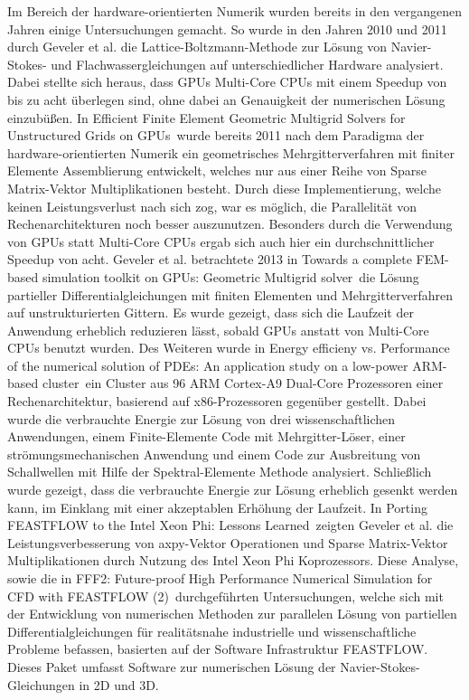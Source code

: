 Im Bereich der hardware-orientierten Numerik wurden bereits in den vergangenen Jahren einige Untersuchungen gemacht. So wurde in den Jahren 2010 und 2011 durch Geveler et al. die Lattice-Boltzmann-Methode zur Lösung von Navier-Stokes- und Flachwassergleichungen auf unterschiedlicher Hardware analysiert. Dabei stellte sich heraus, dass GPUs Multi-Core CPUs mit einem Speedup von bis zu acht überlegen sind, ohne dabei an Genauigkeit der numerischen Lösung einzubü\ss en. 
In \glqq Efficient Finite Element Geometric Multigrid Solvers for Unstructured Grids on GPUs\grqq\, wurde bereits 2011 nach dem Paradigma der hardware-orientierten Numerik ein geometrisches Mehrgitterverfahren mit finiter Elemente Assemblierung entwickelt, welches nur aus einer Reihe von Sparse Matrix-Vektor Multiplikationen besteht. Durch diese Implementierung, welche keinen Leistungsverlust nach sich zog, war es möglich, die Parallelität von Rechenarchitekturen noch besser auszunutzen. Besonders durch die Verwendung von GPUs statt Multi-Core CPUs ergab sich auch hier ein durchschnittlicher Speedup von acht.
Geveler et al. betrachtete 2013 in \glqq 
Towards a complete FEM-based simulation toolkit on GPUs: Geometric Multigrid solver\grqq\, die Lösung partieller Differentialgleichungen mit finiten Elementen und Mehrgitterverfahren auf unstrukturierten Gittern. Es wurde gezeigt, dass sich die Laufzeit der Anwendung erheblich reduzieren lässt, sobald GPUs anstatt von Multi-Core CPUs benutzt wurden. 
Des Weiteren wurde in \glqq Energy efficieny vs. Performance of the numerical solution of PDEs: An application study on a low-power ARM-based cluster\grqq\, ein Cluster aus 96 ARM Cortex-A9 Dual-Core Prozessoren einer Rechenarchitektur, basierend auf x86-Prozessoren gegenüber gestellt. Dabei wurde die verbrauchte Energie zur Lösung von drei wissenschaftlichen Anwendungen, einem Finite-Elemente Code mit Mehrgitter-Löser, einer strömungsmechanischen Anwendung und einem Code zur Ausbreitung von Schallwellen mit Hilfe der Spektral-Elemente Methode analysiert. Schließlich wurde gezeigt, dass die verbrauchte Energie zur Lösung erheblich gesenkt werden kann, im Einklang mit einer akzeptablen Erhöhung der Laufzeit. 
In \glqq Porting FEASTFLOW to the Intel Xeon Phi: Lessons Learned\grqq\, zeigten Geveler et al. die Leistungsverbesserung von axpy-Vektor Operationen und Sparse Matrix-Vektor Multiplikationen durch Nutzung des Intel Xeon Phi Koprozessors. Diese Analyse, sowie die in \glqq FFF2: Future-proof High Performance Numerical Simulation for CFD with FEASTFLOW (2)\grqq\, durchgeführten Untersuchungen, welche sich mit der Entwicklung von numerischen Methoden zur parallelen Lösung von partiellen Differentialgleichungen für realitätsnahe industrielle und wissenschaftliche Probleme befassen, basierten auf der Software Infrastruktur \glqq FEASTFLOW\grqq. Dieses Paket umfasst Software zur numerischen Lösung der Navier-Stokes-Gleichungen in 2D und 3D. 
